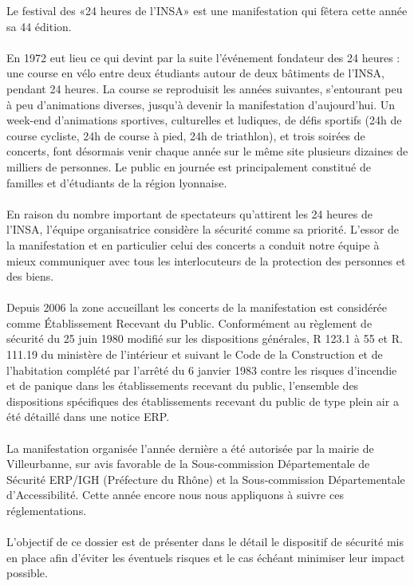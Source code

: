 \documentclass[hidelinks, paper=a4, fontsize=13pt]{report}
\begin{document}
Le festival des «24 heures de l’INSA» est une manifestation qui fêtera cette année sa 44  édition. \\\\
En 1972 eut lieu ce qui devint par la suite l’événement fondateur des 24 heures : une course en vélo entre deux étudiants autour de deux bâtiments de l’INSA, pendant 24 heures. La course se reproduisit les années suivantes, s’entourant peu à peu d’animations diverses, jusqu'à devenir la manifestation d’aujourd'hui. Un week-end d’animations sportives, culturelles et ludiques, de défis sportifs (24h de course cycliste, 24h de course à pied, 24h de triathlon), et trois soirées de concerts, font désormais venir chaque année sur le même site plusieurs dizaines de milliers de personnes. Le public en journée est principalement constitué de familles et d’étudiants de la région lyonnaise. \\\\
En raison du nombre important de spectateurs qu’attirent les 24 heures de l'INSA, l'équipe organisatrice considère la sécurité comme sa priorité. L'essor de la manifestation et en particulier celui des concerts a conduit notre équipe à mieux communiquer avec tous les interlocuteurs de la protection des personnes et des biens.\\\\
Depuis 2006 la zone accueillant les concerts de la manifestation est considérée comme Établissement Recevant du Public. Conformément au règlement de sécurité du 25 juin 1980 modifié sur les dispositions générales, R 123.1 à 55 et R. 111.19 du ministère de l’intérieur et suivant le Code de la Construction et de l’habitation complété par l’arrêté du 6 janvier 1983 contre les risques d’incendie et de panique dans les établissements recevant du public, l’ensemble des dispositions spécifiques des établissements recevant du public de type plein air a été détaillé dans une notice ERP.\\\\
La manifestation organisée l’année dernière a été autorisée par la mairie de Villeurbanne, sur avis favorable de la Sous-commission Départementale de Sécurité ERP/IGH (Préfecture du Rhône) et la Sous-commission Départementale d’Accessibilité. Cette année encore nous nous appliquons à suivre ces réglementations.\\\\
L'objectif de ce dossier est de présenter dans le détail le dispositif de sécurité mis en place afin d'éviter les éventuels risques et le cas échéant minimiser leur impact possible. \\\\
\end{document}
